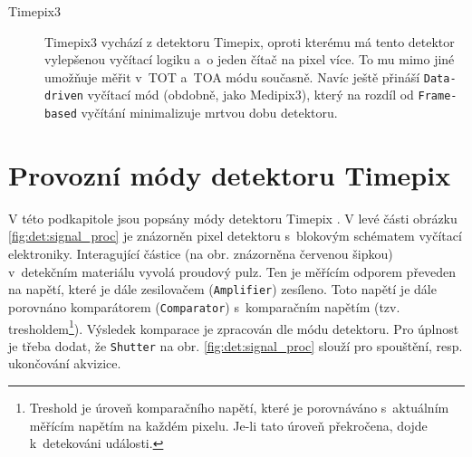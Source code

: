 \begin{description}
	

	\item[Timepix3] Timepix3 vychází z detektoru Timepix, oproti kterému má tento detektor vylepšenou vyčítací logiku a~o jeden čítač na pixel více. To mu mimo jiné umožňuje měřit v~TOT a~TOA módu současně. Navíc ještě přináší \texttt{Data-driven} vyčítací mód (obdobně, jako Medipix3), který na rozdíl od \texttt{Frame-based} vyčítání minimalizuje mrtvou dobu detektoru.

\end{description}

\section{Provozní módy detektoru Timepix}\label{det:mod}
V této podkapitole jsou popsány módy detektoru Timepix \cite{timepix}. 
V levé části obrázku \ref{fig:det:signal_proc} je znázorněn pixel detektoru s~blokovým schématem vyčítací elektroniky. Interagující částice (na obr. znázorněna červenou šipkou) v~detekčním materiálu vyvolá proudový pulz. Ten je měřícím odporem převeden na napětí, které je dále zesilovačem (\texttt{Amplifier}) zesíleno. Toto napětí je dále porovnáno komparátorem (\texttt{Comparator}) s~komparačním napětím (tzv. tresholdem\footnote{Treshold je úroveň komparačního napětí, které je porovnáváno s~aktuálním měřícím napětím na každém pixelu. Je-li tato úroveň překročena, dojde k~detekováni události.}). 
Výsledek komparace je zpracován dle módu detektoru. Pro úplnost je třeba dodat, že \texttt{Shutter} na obr. \ref{fig:det:signal_proc} slouží pro spouštění, resp. ukončování akvizice.


